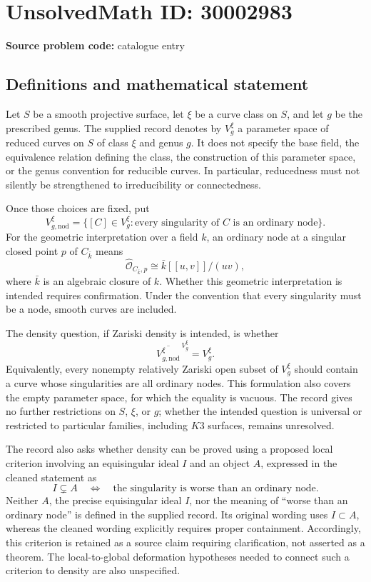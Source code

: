 \documentclass[11pt]{article}
\begin{document}
\section*{UnsolvedMath ID: 30002983}
\textbf{Source problem code:} catalogue entry
\subsection{Definitions and mathematical statement}
Let \(S\) be a smooth projective surface, let \(\xi\) be a curve class on \(S\), and let \(g\) be the prescribed genus. The supplied record denotes by \(V_g^\xi\) a parameter space of reduced curves on \(S\) of class \(\xi\) and genus \(g\). It does not specify the base field, the equivalence relation defining the class, the construction of this parameter space, or the genus convention for reducible curves. In particular, reducedness must not silently be strengthened to irreducibility or connectedness.

Once those choices are fixed, put
\[
V_{g,\mathrm{nod}}^\xi
=\{[C]\in V_g^\xi:\text{every singularity of }C\text{ is an ordinary node}\}.
\]
For the geometric interpretation over a field \(k\), an ordinary node at a singular closed point \(p\) of \(C_{\bar k}\) means
\[
\widehat{\mathcal O}_{C_{\bar k},p}
\cong \bar k[[u,v]]/(uv),
\]
where \(\bar k\) is an algebraic closure of \(k\). Whether this geometric interpretation is intended requires confirmation. Under the convention that every singularity must be a node, smooth curves are included.

The density question, if Zariski density is intended, is whether
\[
\overline{V_{g,\mathrm{nod}}^\xi}^{\,V_g^\xi}=V_g^\xi.
\]
Equivalently, every nonempty relatively Zariski open subset of \(V_g^\xi\) should contain a curve whose singularities are all ordinary nodes. This formulation also covers the empty parameter space, for which the equality is vacuous. The record gives no further restrictions on \(S\), \(\xi\), or \(g\); whether the intended question is universal or restricted to particular families, including \(K3\) surfaces, remains unresolved.

The record also asks whether density can be proved using a proposed local criterion involving an equisingular ideal \(I\) and an object \(A\), expressed in the cleaned statement as
\[
I\subsetneq A
\quad\Longleftrightarrow\quad
\text{the singularity is worse than an ordinary node}.
\]
Neither \(A\), the precise equisingular ideal \(I\), nor the meaning of ``worse than an ordinary node'' is defined in the supplied record. Its original wording uses \(I\subset A\), whereas the cleaned wording explicitly requires proper containment. Accordingly, this criterion is retained as a source claim requiring clarification, not asserted as a theorem. The local-to-global deformation hypotheses needed to connect such a criterion to density are also unspecified.
\end{document}
